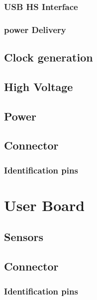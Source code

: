 \documentclass{cernatsnote}
\begin{document}
\subsubsection{USB HS Interface}
\subsubsection{power Delivery}

\subsection{Clock generation}

\subsection{High Voltage}

\subsection{Power}

\subsection{Connector}
\subsubsection{Identification pins}

\section{User Board}
\subsection{Sensors}
\subsection{Connector}
\subsubsection{Identification pins}

\clearpage
\FloatBarrier


\end{document}
